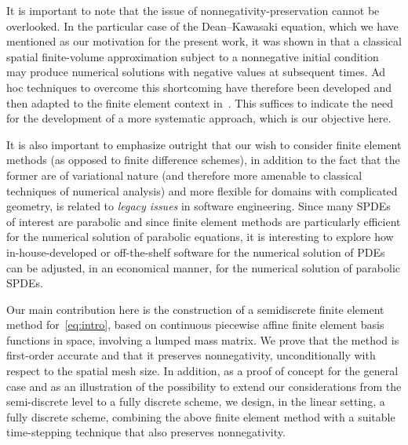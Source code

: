 \documentclass[12pt]{article}
\begin{document}
It is important to note that the issue of nonnegativity-preservation cannot be overlooked. In the particular case of the Dean--Kawasaki equation, which we have mentioned as our motivation for the present work, it was shown in \cite{djurdjevac2024hybrid} that a classical spatial finite-volume approximation subject to a nonnegative initial condition may produce numerical solutions with negative values at subsequent times. Ad hoc techniques to overcome this shortcoming have therefore been developed  and then adapted to the  finite element  context in~\cite{martinez2024finite}.  This suffices to indicate the need for the development of a more systematic approach, which is our objective here.
 
It is also important to emphasize outright that our wish to consider finite element methods (as opposed to finite difference schemes), in addition to the fact that the former are of variational nature (and therefore more amenable to classical techniques of numerical analysis) and more flexible for domains with complicated geometry,  is related to \emph{legacy issues} in software engineering. Since many SPDEs of interest are parabolic and since  finite element methods are particularly efficient for the numerical solution of parabolic equations, it is interesting to explore how in-house-developed or off-the-shelf software for the numerical solution of PDEs can be adjusted, in an economical manner, for the numerical solution of parabolic SPDEs.

Our main contribution here is the construction of a semidiscrete finite element method for~\eqref{eq:intro}, based on continuous piecewise affine finite element basis functions in space, involving a lumped mass matrix. We prove that the method is first-order accurate and that it preserves nonnegativity, unconditionally with respect to the spatial mesh size. 
In addition, as a proof of concept for the general case and as an illustration of the possibility to extend our considerations from the semi-discrete level to a fully discrete scheme, we design, in the linear setting, a fully discrete scheme, combining the above  finite element method with a suitable time-stepping technique that also preserves nonnegativity.  
\end{document}
